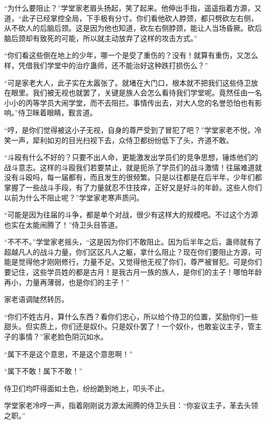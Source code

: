
\begin{this_body}

“为什么要阻止？”学堂家老眉头扬起，笑了起来。他伸出手指，遥遥指着方源，又道，“此子已经掌控全局，下手极有分寸。你们看他砍人脖颈，都只劈砍左右侧，从不砍人的后脑后颈。这是因为他也知道，砍左右侧脖颈，能让人当场昏厥。砍后脑后颈却有致死的可能，所以就主动放弃了这样的攻击方式。”

“你们看这些倒在地上的少年，哪一个是受了重伤的？没有！就算有重伤，又怎么样，凭借我们学堂中的治疗蛊师，还不能治好这种跌打损伤么？”

“可是家老大人，此子实在太嚣张了。就堵在大门口，根本就不把我们这些侍卫放在眼里。我们被无视也就罢了，关键是族人会怎么看待我们学堂呢。竟然任由一名小小的丙等学员大闹学堂，而不去阻拦。事情传出去，对大人您的名誉恐怕也有影响。”侍卫眯着眼睛，觐言道。

“哼，是你们觉得被这小子无视，自身的尊严受到了冒犯了吧？”学堂家老不悦，冷笑一声，犀利如刃的目光扫视下去，众侍卫都纷纷低下了头，齐道不敢。

“斗殴有什么不好的？只要不出人命，更能激发出学员们的竞争思想，锤炼他们的战斗意志。这样的斗殴我们若要禁止，就是扼杀了学员们的战斗激情！往届难道就没有斗殴吗，每一届都有，而且发生的很频繁。只是以往都是在后半年，少年们都掌握了一些战斗手段，有了力量就忍不住技痒，正好又是好斗的年龄。这些人你们以前为什么不阻止呢？”学堂家老寒声质问。

“可能是因为往届的斗争，都是单个对战，很少有这样大的规模吧。不过这个方源也实在太能闹腾了！”侍卫头目答道。

“不不不。”学堂家老摇头，“这是因为你们不敢阻止。因为后半年之后，蛊师就有了超越凡人的战斗力量，你们区区凡人之躯，拿什么阻止？现在你们要阻止方源，可能是觉得他才刚刚修行，力量不足。又觉得他无视了你们，尊严被冒犯。可是你们要记住，这些学员姓的都是古月！是我古月一族的族人，是你们的主子！哪怕年龄再小，力量再薄弱，也是你们的主子！”

家老语调陡然转厉。

“你们不姓古月，算什么东西？看你们忠心，所以给个侍卫的位置，奖励你们一些甜头。但实质上，你们还是奴仆。只是奴仆罢了！一个奴仆，也敢妄议主子，管主子的事情？”家老脸色阴沉如水。

“属下不是这个意思，不是这个意思啊！”

“属下不敢！属下不敢！”

侍卫们均吓得面如土色，纷纷跪到地上，叩头不止。

学堂家老冷哼一声，指着刚刚说方源太闹腾的侍卫头目：“你妄议主子，革去头领之职。”


\end{this_body}

